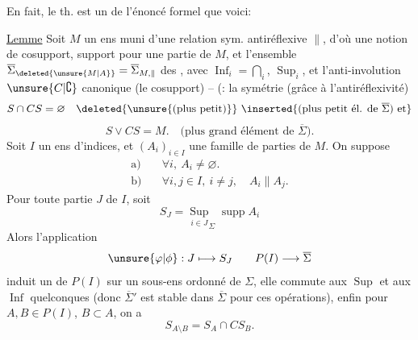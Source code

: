 
En fait, le th. est un   de l'énoncé formel que voici:

\uline{Lemme} Soit $M$ un ens muni d'une relation sym. antiréflexive $\parallel$, d'où une notion de cosupport, support pour une partie de $M$, et l'ensemble $\overline\Sigma_{\deleted{\unsure{M|A}}}=\overline\Sigma_{M,\parallel}$ des , avec $\operatorname{Inf}_i=\bigcap_i$, $\operatorname{Sup}_i$, et l'anti-involution $\unsure{C|\complement}$ canonique (le cosupport) -- (: la symétrie   (grâce à l'antiréflexivité)
\[
S\cap CS=\varnothing\quad\deleted{\text{\unsure{(plus petit)}}}\ \inserted{\text{(plus petit él. de }\overline\Sigma\text{) et}}
\]
\[
S\vee CS=M.\quad\text{(plus grand élément de }\overline\Sigma\text{)}.
\]
Soit $I$ un ens d'indices, et $(A_i)_{i\in I}$ une famille de parties de $M$.  On suppose
\[
\begin{aligned}
\text{a)}\quad&\forall i,\ A_i\ne\varnothing.\\
\text{b)}\quad&\forall i,j\in I,\ i\ne j,\quad A_i\parallel A_j.
\end{aligned}
\]
Pour toute partie $J$ de $I$, soit
\[
S_J=\underset{i\in J}{\operatorname{Sup}}_{\Sigma}\operatorname{supp}A_i
\]
Alors l'application
\[
\unsure{\varphi|\phi}:J\longmapsto S_J\qquad P(I)\longrightarrow\overline\Sigma
\]
 induit un  de $P(I)$ sur un sous-ens ordonné  de $\Sigma$, elle commute aux $\operatorname{Sup}$ et aux $\operatorname{Inf}$ quelconques (donc $\overline\Sigma'$ est stable dans $\overline\Sigma$ pour ces opérations), enfin pour $A,B\in P(I)$, $B\subset A$, on a
\[
S_{A\setminus B}=S_A\cap CS_B.
\]
